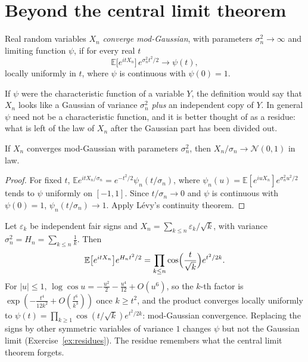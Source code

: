 \section{Beyond the central limit theorem}

\begin{definition}\label{def:modgauss}
Real random variables $X_n$ \emph{converge mod-Gaussian}, with parameters $\sigma_n^2\to\infty$ and limiting function $\psi$, if for every real $t$
\[
\mathbb E\bigl[e^{itX_n}\bigr]\,e^{\sigma_n^2t^2/2}\longrightarrow\psi(t),
\]
locally uniformly in $t$, where $\psi$ is continuous with $\psi(0)=1$.
\end{definition}

If $\psi$ were the characteristic function of a variable $Y$, the definition would say that $X_n$ looks like a Gaussian of variance $\sigma_n^2$ \emph{plus} an independent copy of $Y$. In general $\psi$ need not be a characteristic function, and
it is better thought of as a residue: what is left of the law of $X_n$ after the Gaussian part has been divided out.

\begin{proposition}\label{prop:modgaussclt}
If $X_n$ converges mod-Gaussian with parameters $\sigma_n^2$, then $X_n/\sigma_n\to\mathcal N(0,1)$ in law.
\end{proposition}
\begin{proof}
For fixed $t$, $\mathbb Ee^{itX_n/\sigma_n}=e^{-t^2/2}\psi_n(t/\sigma_n)$, where $\psi_n(u)=\mathbb E[e^{iuX_n}]e^{\sigma_n^2u^2/2}$ tends to $\psi$ uniformly on $[-1,1]$. Since $t/\sigma_n\to0$ and $\psi$ is continuous with $\psi(0)=1$, $\psi_n(t/\sigma_n)\to1$. Apply L\'evy's continuity theorem.
\end{proof}

\begin{example}\label{ex:harmonicwalk}
Let $\varepsilon_k$ be independent fair signs and $X_n=\sum_{k\le n}\varepsilon_k/\sqrt k$, with variance $\sigma_n^2=H_n=\sum_{k\le n}\frac1k$. Then
\[
\mathbb E\bigl[e^{itX_n}\bigr]e^{H_nt^2/2}=\prod_{k\le n}\cos\Bigl(\frac t{\sqrt k}\Bigr)e^{t^2/2k}.
\]
For $|u|\le1$, $\log\cos u=-\frac{u^2}2-\frac{u^4}{12}+O(u^6)$, so the $k$-th factor is $\exp(-\frac{t^4}{12k^2}+O(\frac{t^6}{k^3}))$ once $k\ge t^2$, and the product converges locally uniformly to $\psi(t)=\prod_{k\ge1}\cos(t/\sqrt k)e^{t^2/2k}$:
mod-Gaussian convergence. Replacing the signs by other symmetric variables of variance $1$ changes $\psi$ but not the Gaussian limit (Exercise~\ref{ex:residues}). The residue remembers what the central limit theorem forgets.
\end{example}

